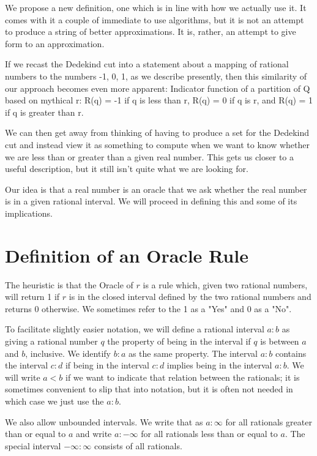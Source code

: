 \documentclass[12pt]{article}
\begin{document}
We propose a new definition, one which is in line with how we actually use it.
It comes with it a couple of immediate to use algorithms, but it is not an
attempt to produce a string of better approximations. It is, rather, an
attempt to give form to an approximation.

If we recast the Dedekind cut into a statement about a mapping of rational
numbers to the numbers -1, 0, 1, as we describe presently, then this
similarity of our approach becomes even more apparent: 
Indicator function of a partition of Q based on mythical r: 
R(q) = -1 if q is less than r, R(q) = 0 if q is r, and R(q) = 1 if q is
greater than r. 

We can then get away from thinking of having to produce a set for the Dedekind
cut and instead view it as something to compute when we want to know whether
we are less than or greater than a given real number. This gets us closer to a
useful description, but it still isn't quite what we are looking for. 

Our idea is that a real number is an oracle that we ask whether the real
number is in a given rational interval. We will proceed in defining this and
some of its implications. 



\section{Definition of an Oracle Rule}\label{sec:ora}

The heuristic is that the Oracle of $r$ is a rule which, given two rational numbers, will return 1 if
$r$ is in the closed interval defined by the two rational numbers and returns 0
otherwise. We sometimes refer to the 1 as a "Yes" and 0 as a "No".

To facilitate slightly easier notation, we will define a rational interval $a:b$ as giving a rational number $q$ the property of being in the interval if $q$ is between $a$ and $b$, inclusive. We identify $b:a$ as the same property. The interval $a:b$ contains the interval $c:d$ if being in the interval $c:d$ implies being in the interval $a:b$. We will write $a<b$ if we want to indicate that relation between the rationals; it is sometimes convenient to slip that into notation, but it is often not needed in which case we just use the $a:b$.

We also allow unbounded intervals. We write that as $a:\infty$ for all rationals greater than or equal to $a$ and write $a:-\infty$ for all rationals less than or equal to $a$. The special interval $-\infty:\infty$ consists of all rationals. 
\end{document}
